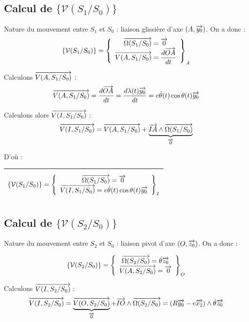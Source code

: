 \documentclass[11pt,oneside]{article}
\begin{document}
\subsection*{Calcul de $\{\mathcal{V}(S_1/S_0)\}$}

Nature du mouvement entre $S_1$ et $S_0$ : liaison glissière d'axe $(A,\overrightarrow{y_0})$.
On a donc : 
$$
\{\mathcal{V}(S_1/S_0)\} =
\left\{
\begin{array}{c}
\overrightarrow{\Omega(S_1/S_0)} = \overrightarrow{0} \\
\overrightarrow{V(A,S_1/S_0)} = \dfrac{d\overrightarrow{OA}}{dt} \\
\end{array}
\right\}_A
$$

Calculons $\overrightarrow{V(A,S_1/S_0)}$ :
$$
\overrightarrow{V(A,S_1/S_0)} = \dfrac{d\overrightarrow{OA}}{dt} = \dfrac{d\lambda(t)\overrightarrow{y_0}}{dt} =  e \dot{\theta}(t) \cos \theta(t) \overrightarrow{y_0}
$$

Calculons alors $\overrightarrow{V(I,S_1/S_0)}$ :
$$
\overrightarrow{V(I,S_1/S_0)} = \overrightarrow{V(A,S_1/S_0)} + \underbrace{\overrightarrow{IA} \wedge \overrightarrow{\Omega(S_1/S_0)}}_{\overrightarrow{0}}
$$

D'où :
\begin{center}
\begin{tabular}{|p{8cm}|}
\hline
$$
\{\mathcal{V}(S_1/S_0)\} =
\left\{
\begin{array}{c}
\overrightarrow{\Omega(S_1/S_0)} = \overrightarrow{0} \\
\overrightarrow{V(I,S_1/S_0)} = e \dot{\theta}(t) \cos \theta(t) \overrightarrow{y_0}  \\
\end{array}
\right\}_I
$$
\\
\hline
\end{tabular}
\end{center}

\subsection*{Calcul de $\{\mathcal{V}(S_2/S_0)\}$}
Nature du mouvement entre $S_2$ et $S_0$ : liaison pivot d'axe $(O,\overrightarrow{z_0})$.
On a donc : 

$$
\{\mathcal{V}(S_2/S_0)\} =
\left\{
\begin{array}{c}
\overrightarrow{\Omega(S_2/S_0)} = \dot{\theta}\overrightarrow{z_0} \\
\overrightarrow{V(A,S_2/S_0)} = \overrightarrow{0} \\
\end{array}
\right\}_O
$$

Calculons $\overrightarrow{V(I,S_2/S_0)}$ :
$$
\overrightarrow{V(I,S_2/S_0)} = 
\underbrace{\overrightarrow{V(O,S_2/S_0)}}_{\overrightarrow{0} }
+ \overrightarrow{IO} \wedge \overrightarrow{\Omega(S_2/S_0)} = \left(R\overrightarrow{y_0}-e\overrightarrow{x_2}\right) \wedge \dot{\theta}\overrightarrow{z_0}
$$
\end{document}
